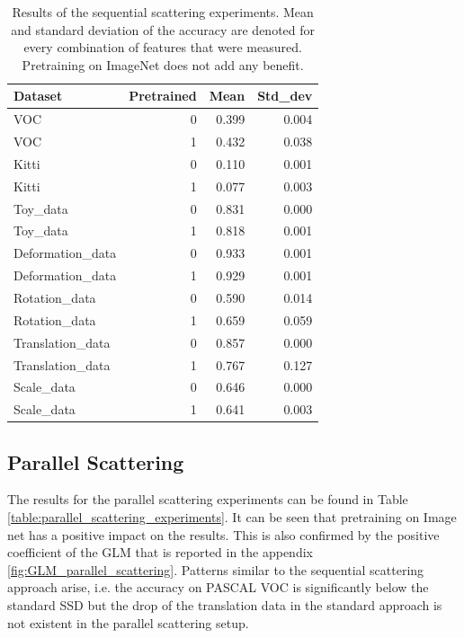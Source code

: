 \begin{table}[!htb]
	\centering
	\caption{Results of the sequential scattering experiments. Mean and standard deviation of the accuracy are denoted for every combination of features that were measured. Pretraining on ImageNet does not add any benefit.}
	\begin{tabular}{lrrr}
		\toprule
		Dataset &  Pretrained &   Mean &  Std\_dev \\
		\midrule
		VOC &           0 &  0.399 &    0.004 \\
		VOC &           1 &  0.432 &    0.038 \\\hdashline
		Kitti &           0 &  0.110 &    0.001 \\
		Kitti &           1 &  0.077 &    0.003 \\\hdashline
		Toy\_data &           0 &  0.831 &    0.000 \\
		Toy\_data &           1 &  0.818 &    0.001 \\\hdashline
		Deformation\_data &           0 &  0.933 &    0.001 \\
		Deformation\_data &           1 &  0.929 &    0.001 \\\hdashline
		Rotation\_data &           0 &  0.590 &    0.014 \\
		Rotation\_data &           1 &  0.659 &    0.059 \\\hdashline
		Translation\_data &           0 &  0.857 &    0.000 \\
		Translation\_data &           1 &  0.767 &    0.127 \\\hdashline
		Scale\_data &           0 &  0.646 &    0.000 \\
		Scale\_data &           1 &  0.641 &    0.003 \\
		\bottomrule
	\end{tabular}
\label{table:sequential_scattering_experiments}
\end{table}

\subsection{Parallel Scattering}
\label{subsec:parallel_scattering_results}


The results for the parallel scattering experiments can be found in Table \ref{table:parallel_scattering_experiments}. It can be seen that pretraining on Image net has a positive impact on the results. This is also confirmed by the positive coefficient of the GLM that is reported in the appendix \ref{fig:GLM_parallel_scattering}. Patterns similar to the sequential scattering approach arise, i.e. the accuracy on PASCAL VOC is significantly below the standard SSD but the drop of the translation data in the standard approach is not existent in the parallel scattering setup.

